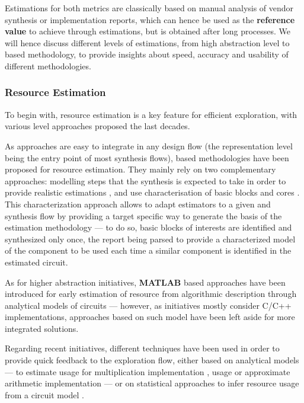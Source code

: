         Estimations for both metrics are classically based on manual analysis of vendor synthesis or implementation reports, which can hence be used as the {\bf reference value} to achieve through estimations, but is obtained after long processes.
        We will hence discuss different levels of estimations, from high abstraction level to  based methodology, to provide insights about speed, accuracy and usability of different methodologies.

        \subsubsection{Resource Estimation} 
            To begin with, resource estimation is a key feature for efficient exploration, with various level approaches proposed the last decades.

            As  approaches are easy to integrate in any design flow (the representation level being the entry point of most synthesis flows),  based methodologies have been proposed for resource estimation.
            They mainly rely on two complementary approaches: modelling steps that the synthesis is expected to take in order to provide realistic estimations \cite{schumacher_fast_2008}, and use characterisation of basic blocks and  cores \cite{deng_accurate_2008}.
            This characterization approach allows to adapt estimators to a given  and synthesis flow by providing a target specific way to generate the basis of the estimation methodology --- to do so, basic blocks of interests are identified and synthesized only once, the report being parsed to provide a characterized model of the component to be used each time a similar component is identified in the estimated circuit.

            As for higher abstraction initiatives, {\bf MATLAB} based approaches have been introduced for early estimation of resource from algorithmic description through analytical models of circuits \cite{nayak_accurate_2002}\cite{hutchison_system_2004} --- however, as  initiatives mostly consider C/C++ implementations, approaches based on such model have been left aside for more integrated solutions.

\clearpage
            Regarding  recent initiatives, different techniques have been used in order to provide quick feedback to the exploration flow, either based on analytical models --- \eg to estimate  usage for multiplication implementation \cite{aung_rapid_2015},  usage \cite{zhao_performance_2020} or approximate arithmetic implementation \cite{castro-godinez_axhls_2020} --- or on statistical approaches to infer resource usage from a circuit model \cite{meeuws_quipu_2013}.

